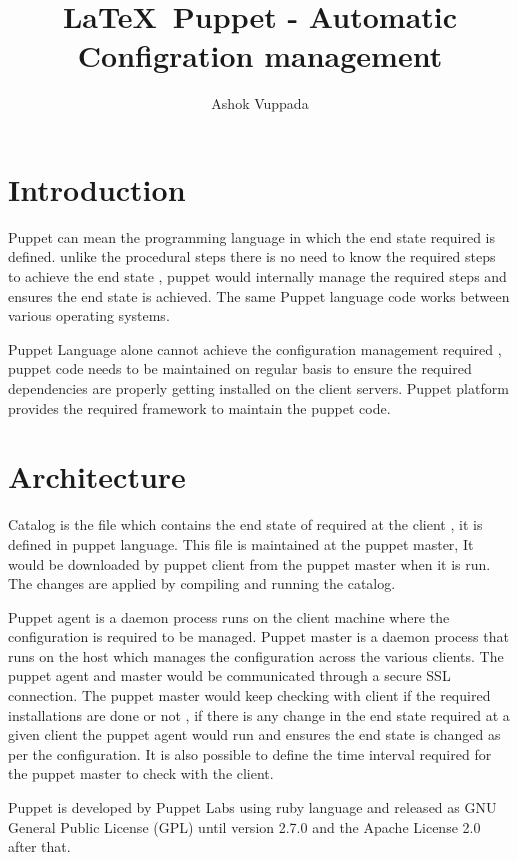 \documentclass[9pt,twocolumn,twoside]{../../styles/osajnl}
\title{\LaTeX\ Puppet - Automatic Configration management }
\author[1,*]{Ashok Vuppada}
\affil[1]{School of Informatics and Computing, Bloomington, IN 47408, U.S.A.}
\affil[*]{Corresponding authors: ashokmadhu66@gmail.com}
\begin{document}
\maketitle

\section{Introduction}

Puppet can mean the programming language in which the end state
required is defined. unlike the procedural steps there is no need to
know the required steps to achieve the end state , puppet would
internally manage the required steps and ensures the end state is
achieved. The same Puppet language code works between various
operating systems. \cite{www-infoq}

Puppet Language alone cannot achieve the configuration management
required , puppet code needs to be maintained on regular basis to
ensure the required dependencies are properly getting installed on the
client servers. Puppet platform provides the required framework to
maintain the puppet code. \cite{www-infoq}

\section{Architecture}

Catalog is the file which contains the end state of required at the
client , it is defined in puppet language. This file is maintained at
the puppet master, It would be downloaded by puppet client from the
puppet master when it is run. The changes are applied by compiling and
running the catalog.\cite{www-docpuppet}

Puppet agent is a daemon process runs on the client machine where the
configuration is required to be managed. Puppet master is a daemon
process that runs on the host which manages the configuration across
the various clients. The puppet agent and master would be communicated
through a secure SSL connection. The puppet master would keep checking
with client if the required installations are done or not , if there
is any change in the end state required at a given client the puppet
agent would run and ensures the end state is changed as per the
configuration. It is also possible to define the time interval
required for the puppet master to check with the client.\cite{www-slashroot}

Puppet is developed by Puppet Labs using ruby language and released as
GNU General Public License (GPL) until version 2.7.0 and the Apache
License 2.0 after that.\cite{www-wiki-puppet}
\end{document}
